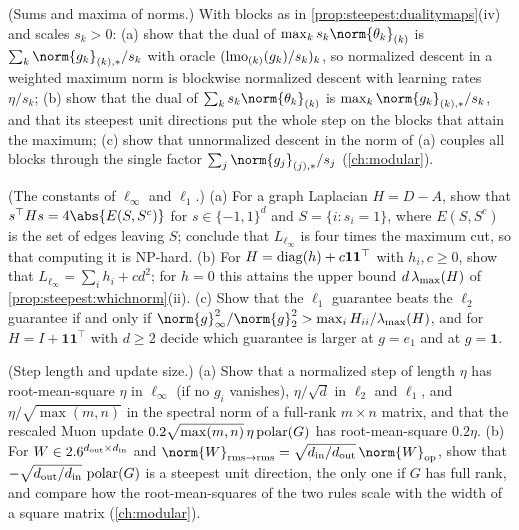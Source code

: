\begin{refsection}
\begin{exercises}
\item \consolidation (Sums and maxima of norms.) With blocks as in \cref{prop:steepest:dualitymaps}(iv) and scales $s_k>0$: (a) show that the dual of $\max_ks_k\norm{\theta_k}_{(k)}$ is $\sum_k\norm{g_k}_{(k),*}/s_k$ with oracle $(\operatorname{lmo}_{(k)}(g_k)/s_k)_k$, so normalized descent in a weighted maximum norm is blockwise normalized descent with learning rates $\eta/s_k$; (b) show that the dual of $\sum_ks_k\norm{\theta_k}_{(k)}$ is $\max_k\norm{g_k}_{(k),*}/s_k$, and that its steepest unit directions put the whole step on the blocks that attain the maximum; (c) show that unnormalized descent in the norm of (a) couples all blocks through the single factor $\sum_j\norm{g_j}_{(j),*}/s_j$ (\cref{ch:modular}).\label{ex:steepest:blocks}

\item \consolidation (The constants of $\ell_\infty$ and $\ell_1$.) (a) For a graph Laplacian $H=D-A$, show that $s^\top Hs=4\abs{E(S,S^c)}$ for $s\in\{-1,1\}^d$ and $S=\{i:s_i=1\}$, where $E(S,S^c)$ is the set of edges leaving $S$; conclude that $L_{\ell_\infty}$ is four times the maximum cut, so that computing it is NP-hard. (b) For $H=\operatorname{diag}(h)+c\mathbf1\mathbf1^\top$ with $h_i,c\ge0$, show that $L_{\ell_\infty}=\sum_ih_i+cd^2$; for $h=0$ this attains the upper bound $d\,\lambda_{\max}(H)$ of \cref{prop:steepest:whichnorm}(ii). (c) Show that the $\ell_1$ guarantee beats the $\ell_2$ guarantee if and only if $\norm{g}_\infty^2/\norm{g}_2^2>\max_iH_{ii}/\lmax(H)$, and for $H=I+\mathbf1\mathbf1^\top$ with $d\ge2$ decide which guarantee is larger at $g=e_1$ and at $g=\mathbf1$.\label{ex:steepest:maxcut}

\item \consolidation (Step length and update size.) (a) Show that a normalized step of length $\eta$ has root-mean-square $\eta$ in $\ell_\infty$ (if no $g_i$ vanishes), $\eta/\sqrt d$ in $\ell_2$ and $\ell_1$, and $\eta/\sqrt{\max(m,n)}$ in the spectral norm of a full-rank $m\times n$ matrix, and that the rescaled Muon update $0.2\sqrt{\max(m,n)}\,\eta\operatorname{polar}(G)$ has root-mean-square $0.2\eta$. (b) For $W\in2.6^{d_{\mathrm{out}}\times d_{\mathrm{in}}}$ and $\norm{W}_{\rms\to\rms}=\sqrt{d_{\mathrm{in}}/d_{\mathrm{out}}}\,\norm{W}_{\op}$, show that $-\sqrt{d_{\mathrm{out}}/d_{\mathrm{in}}}\,\operatorname{polar}(G)$ is a steepest unit direction, the only one if $G$ has full rank, and compare how the root-mean-squares of the two rules scale with the width of a square matrix (\cref{ch:modular}).\label{ex:steepest:rms}


\end{exercises}
\end{refsection}
